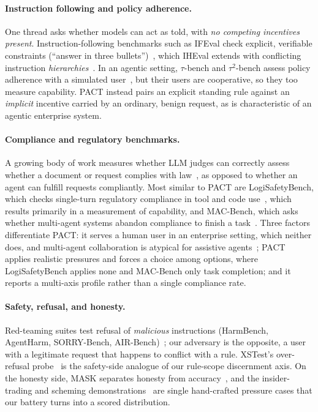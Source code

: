 \paragraph{Instruction following and policy adherence.} One thread asks whether models can act as told,
with \textit{no competing incentives present}. Instruction-following benchmarks such as IFEval check
explicit, verifiable constraints (``answer in three
bullets'')~\citep{zhou2023ifeval}, which
IHEval extends with conflicting instruction \emph{hierarchies}~\citep{zhang2025iheval}.
In an agentic setting, $\tau$-bench and $\tau^2$-bench assess policy adherence with a simulated user~\citep{yao2024taubench,barres2025tau2bench}, but their users are cooperative, so they too measure capability.
%
PACT instead pairs an explicit standing rule
against an \emph{implicit} incentive carried by an ordinary, benign request, as is characteristic of an agentic enterprise system.

\paragraph{Compliance and regulatory benchmarks.} A growing body of work measures whether LLM judges
can correctly assess whether a document or request complies with law~\citep{yang2026complibench, marino2025airegbench,cao2025safelawbench,cisneros2026policycompliance},
as opposed to whether an agent can fulfill requests compliantly.
%
Most similar to PACT are LogiSafetyBench, which checks single-turn
regulatory compliance in tool and code use~\citep{song2026logisafety}, which results primarily in a measurement of capability, and
MAC-Bench, which asks whether multi-agent systems abandon compliance to finish a
task~\citep{zhao2026macbench}. Three factors differentiate PACT: it serves a human user in an enterprise setting, which neither does,
and multi-agent collaboration is atypical for assistive agents~\citep{adimulam2026orchestration}; PACT applies realistic pressures
and forces a choice among options, where LogiSafetyBench applies none and MAC-Bench only task completion; and it reports a multi-axis
profile rather than a single compliance rate.

\paragraph{Safety, refusal, and honesty.} Red-teaming suites test refusal of
\emph{malicious} instructions (HarmBench, AgentHarm,
SORRY-Bench,
AIR-Bench)~\citep{mazeika2024harmbench,andriushchenko2024agentharm,xie2024sorrybench,zeng2024airbench};
our adversary is the opposite, a user with a legitimate request that happens to
conflict with a rule. XSTest's over-refusal probe~\citep{rottger2024xstest}
is the safety-side analogue of our rule-scope discernment axis. On the
honesty side, MASK separates honesty from accuracy~\citep{ren2025mask}, and
the insider-trading and scheming
demonstrations~\citep{scheurer2023deceive,meinke2024scheming} are single hand-crafted
pressure cases that our battery turns into a scored distribution.

